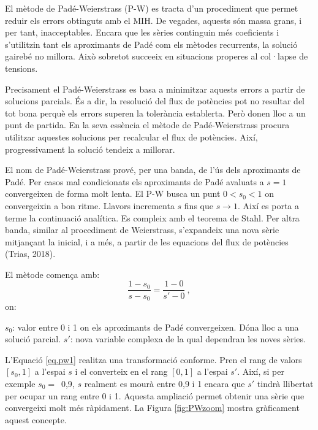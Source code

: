 El mètode de Padé-Weierstrass (P-W) es tracta d'un procediment que permet reduir els errors obtinguts amb el MIH. De vegades, aquests són massa grans, i per tant, inacceptables. Encara que les sèries continguin més coeficients i s'utilitzin tant els aproximants de Padé com els mètodes recurrents, la solució gairebé no millora. Això sobretot succeeix en situacions properes al col·lapse de tensions. 

Precisament el Padé-Weierstrass es basa a minimitzar aquests errors a partir de solucions parcials. És a dir, la resolució del flux de potències pot no resultar del tot bona perquè els errors superen la tolerància establerta. Però donen lloc a un punt de partida. En la seva essència el mètode de Padé-Weierstrass procura utilitzar aquestes solucions per recalcular el flux de potències. Així, progressivament la solució tendeix a millorar.

El nom de Padé-Weierstrass prové, per una banda, de l'ús dels aproximants de Padé. Per casos mal condicionats els aproximants de Padé avaluats a $s=1$ convergeixen de forma molt lenta. El P-W busca un punt $0<s_0<1$ on convergeixin a bon ritme. Llavors incrementa $s$ fins que $s\rightarrow 1$. Així es porta a terme la continuació analítica. Es compleix amb el teorema de Stahl. Per altra banda, similar al procediment de Weierstrass, s'expandeix una nova sèrie mitjançant la inicial, i a més, a partir de les equacions del flux de potències (Trias, 2018). %

El mètode comença amb:
\begin{equation}
    \frac{1-s_0}{s-s_0}=\frac{1-0}{s'-0}\ ,
    \label{eq.pw1}
\end{equation}
on:

$s_0$: valor entre 0 i 1 on els aproximants de Padé convergeixen. Dóna lloc a una solució parcial.
\vs
$s'$: nova variable complexa de la qual dependran les noves sèries.

L'Equació \ref{eq.pw1} realitza una transformació conforme. Pren el rang de valors $[s_0, 1]$ a l'espai $s$ i el converteix en el rang $[0, 1]$ a l'espai $s'$. Així, si per exemple $s_0=$\ 0,9, $s$ realment es mourà entre 0,9 i 1 encara que $s'$ tindrà llibertat per ocupar un rang entre 0 i 1. Aquesta ampliació permet obtenir una sèrie que convergeixi molt més ràpidament. La Figura \ref{fig:PWzoom} mostra gràficament aquest concepte.

